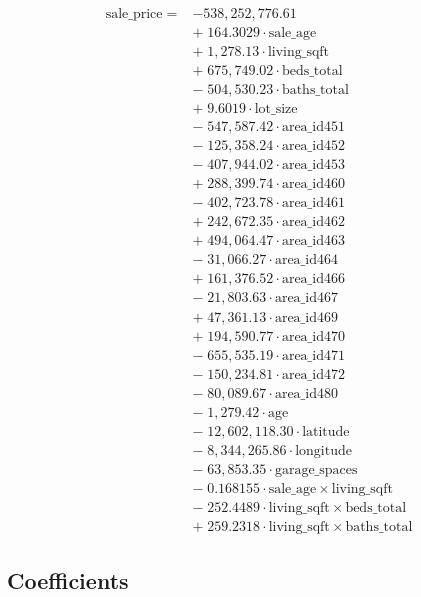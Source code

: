 \documentclass[
]{article}
\begin{document}
\[
 \begin{array}{rl}
\text{sale\_price} \;=\; & -538,252,776.61 \\
& + \; 164.3029 \cdot \text{sale\_age} \\
& + \; 1,278.13 \cdot \text{living\_sqft} \\
& + \; 675,749.02 \cdot \text{beds\_total} \\
& - \; 504,530.23 \cdot \text{baths\_total} \\
& + \; 9.6019 \cdot \text{lot\_size} \\
& - \; 547,587.42 \cdot \text{area\_id451} \\
& - \; 125,358.24 \cdot \text{area\_id452} \\
& - \; 407,944.02 \cdot \text{area\_id453} \\
& + \; 288,399.74 \cdot \text{area\_id460} \\
& - \; 402,723.78 \cdot \text{area\_id461} \\
& + \; 242,672.35 \cdot \text{area\_id462} \\
& + \; 494,064.47 \cdot \text{area\_id463} \\
& - \; 31,066.27 \cdot \text{area\_id464} \\
& + \; 161,376.52 \cdot \text{area\_id466} \\
& - \; 21,803.63 \cdot \text{area\_id467} \\
& + \; 47,361.13 \cdot \text{area\_id469} \\
& + \; 194,590.77 \cdot \text{area\_id470} \\
& - \; 655,535.19 \cdot \text{area\_id471} \\
& - \; 150,234.81 \cdot \text{area\_id472} \\
& - \; 80,089.67 \cdot \text{area\_id480} \\
& - \; 1,279.42 \cdot \text{age} \\
& - \; 12,602,118.30 \cdot \text{latitude} \\
& - \; 8,344,265.86 \cdot \text{longitude} \\
& - \; 63,853.35 \cdot \text{garage\_spaces} \\
& - \; 0.168155 \cdot \text{sale\_age} \times \text{living\_sqft} \\
& - \; 252.4489 \cdot \text{living\_sqft} \times \text{beds\_total} \\
& + \; 259.2318 \cdot \text{living\_sqft} \times \text{baths\_total}
\end{array} 
\]

\subsection{Coefficients}\label{coefficients}
\end{document}
